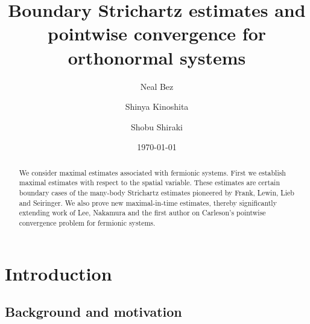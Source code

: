 \documentclass[a4paper]{amsart}
\author[Bez]{Neal Bez}
\author[Kinoshita]{Shinya Kinoshita}
\author[Shiraki]{Shobu Shiraki}
\numberwithin{equation}{section}%
\theoremstyle{plain}%
\theoremstyle{definition}
\theoremstyle{remark}%
\begin{document}
\date{\today}
\title[
]
{
Boundary Strichartz estimates and pointwise convergence for orthonormal systems
}


\keywords{}
\subjclass[2010]{}
\begin{abstract}
We consider maximal estimates associated with fermionic systems. First we establish maximal estimates with respect to the spatial variable. These estimates are certain boundary cases of the many-body Strichartz estimates pioneered by Frank, Lewin, Lieb and Seiringer. We also prove new maximal-in-time estimates, thereby significantly extending work of Lee, Nakamura and the first author on Carleson’s pointwise convergence problem for fermionic systems. 
\end{abstract}

\maketitle


\section{Introduction}

\subsection{Background and motivation}
\end{document}
